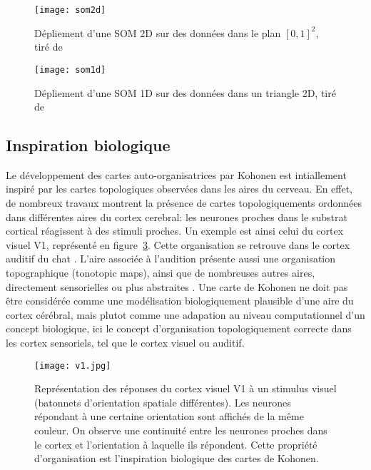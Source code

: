 \documentclass[../main]{subfiles}
\begin{document}
\begin{figure}
\centering
\texttt{[image: som2d]}
\caption{Dépliement d'une SOM 2D sur des données dans le plan $[0,1]^2$, tiré de~\cite{Kohonen1995SelfOrganizingM} \label{fig:som2d}}

\end{figure}

\begin{figure}
\centering
\texttt{[image: som1d]}
\caption{Dépliement d'une SOM 1D sur des données dans un triangle 2D, tiré de~\cite{Kohonen1995SelfOrganizingM}\label{fig:som1d}}

\end{figure}


\subsection{Inspiration biologique}


Le développement des cartes auto-organisatrices par Kohonen est intiallement inspiré par les cartes topologiques observées dans les aires du cerveau. 
En effet, de nombreux travaux montrent la présence de cartes topologiquements ordonnées dans différentes aires du cortex cerebral:
les neurones proches dans le substrat cortical réagissent à des stimuli proches. 
Un exemple est ainsi celui du cortex visuel V1, représenté en figure~\ref{fig:v1}. Cette organisation se retrouve dans le cortex auditif du chat \cite{Reale1980TonotopicOI}.
L'aire associée à l'audition présente aussi une organisation topographique (tonotopic maps), ainsi que de nombreuses autres aires, directement sensorielles ou plus abstraites \cite{Kohonen1995SelfOrganizingM}. 
Une carte de Kohonen ne doit pas être considérée comme une modélisation biologiquement plausible d'une aire du cortex cérébral, mais plutot comme une adapation au niveau computationnel d'un concept biologique, ici le concept d'organisation topologiquement correcte dans les cortex sensoriels, tel que le cortex visuel ou auditif.

\begin{figure}
\centering
\texttt{[image: v1.jpg]}
\caption{Représentation des réponses du cortex visuel V1 à un stimulus visuel (batonnets d'orientation spatiale différentes). Les neurones répondant à une certaine orientation sont affichés de la même couleur. On observe une continuité entre les neurones proches dans le cortex et l'orientation à laquelle ils répondent. Cette propriété d'organisation est l'inspiration biologique des cartes de Kohonen.}
\label{fig:v1}
\end{figure}
\end{document}
